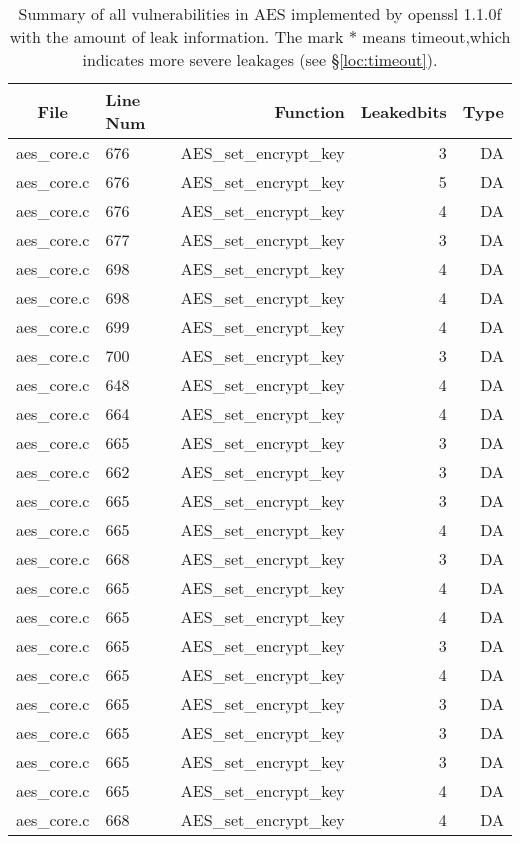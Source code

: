 \begin{table}%
\centering\tiny
\caption{Summary of all vulnerabilities in AES implemented by openssl 1.1.0f with the amount of leak information. The mark $*$ means timeout,which indicates more severe leakages (see \S\ref{loc:timeout}).}\label{tab:AESopenssl}
\begin{tabular}{clrrr}
\hline
\textbf{File} & \textbf{Line Num} & \textbf{Function} & \textbf{Leakedbits} & \textbf{Type} \\\hline
aes\_core.c& 676&AES\_set\_encrypt\_key&3 &DA\\
aes\_core.c& 676&AES\_set\_encrypt\_key&5 &DA\\
aes\_core.c& 676&AES\_set\_encrypt\_key&4 &DA\\
aes\_core.c& 677&AES\_set\_encrypt\_key&3 &DA\\
aes\_core.c& 698&AES\_set\_encrypt\_key&4 &DA\\
aes\_core.c& 698&AES\_set\_encrypt\_key&4 &DA\\
aes\_core.c& 699&AES\_set\_encrypt\_key&4 &DA\\
aes\_core.c& 700&AES\_set\_encrypt\_key&3 &DA\\
aes\_core.c& 648&AES\_set\_encrypt\_key&4 &DA\\
aes\_core.c& 664&AES\_set\_encrypt\_key&4 &DA\\
aes\_core.c& 665&AES\_set\_encrypt\_key&3 &DA\\
aes\_core.c& 662&AES\_set\_encrypt\_key&3 &DA\\
aes\_core.c& 665&AES\_set\_encrypt\_key&3 &DA\\
aes\_core.c& 665&AES\_set\_encrypt\_key&4 &DA\\
aes\_core.c& 668&AES\_set\_encrypt\_key&3 &DA\\
aes\_core.c& 665&AES\_set\_encrypt\_key&4 &DA\\
aes\_core.c& 665&AES\_set\_encrypt\_key&4 &DA\\
aes\_core.c& 665&AES\_set\_encrypt\_key&3 &DA\\
aes\_core.c& 665&AES\_set\_encrypt\_key&4 &DA\\
aes\_core.c& 665&AES\_set\_encrypt\_key&3 &DA\\
aes\_core.c& 665&AES\_set\_encrypt\_key&3 &DA\\
aes\_core.c& 665&AES\_set\_encrypt\_key&3 &DA\\
aes\_core.c& 665&AES\_set\_encrypt\_key&4 &DA\\
aes\_core.c& 668&AES\_set\_encrypt\_key&4 &DA\\

\end{tabular}
\end{table}

